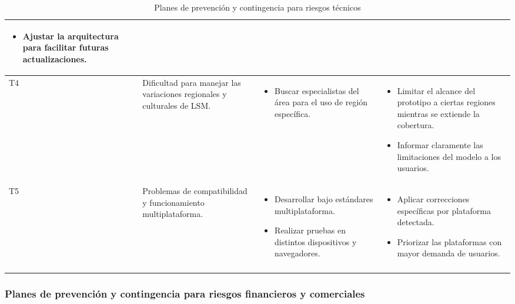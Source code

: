 \begin{longtable}{|>{\centering\arraybackslash}p{0.8cm}|>{\raggedright\arraybackslash}p{3.5cm}|>{\raggedright\arraybackslash}p{5.1cm}|>{\raggedright\arraybackslash}p{5.1cm}|}
\begin{itemize}
		\item Ajustar la arquitectura para facilitar futuras actualizaciones.
	\end{itemize} \\
	\hline
	T4 & Dificultad para manejar las variaciones regionales y culturales de LSM. &
	\begin{itemize}
		\item Buscar especialistas del área para el uso de región específica.
	\end{itemize} &
	\begin{itemize}
		\item Limitar el alcance del prototipo a ciertas regiones mientras se extiende la cobertura.
		\item Informar claramente las limitaciones del modelo a los usuarios.
	\end{itemize} \\
	\hline
	T5 & Problemas de compatibilidad y funcionamiento multiplataforma. &
	\begin{itemize}
		\item Desarrollar bajo estándares multiplataforma.
		\item Realizar pruebas en distintos dispositivos y navegadores.
	\end{itemize} &
	\begin{itemize}
		\item Aplicar correcciones específicas por plataforma detectada.
		\item Priorizar las plataformas con mayor demanda de usuarios.
	\end{itemize} \\
	\hline
	\caption{Planes de prevención y contingencia para riesgos técnicos} \label{tab:riesgos_tecnicos}
\end{longtable}


\newpage

\subsubsection{Planes de prevención y contingencia para riesgos financieros y comerciales}

\setlength{\tabcolsep}{4pt}
\renewcommand{\arraystretch}{1.2}

